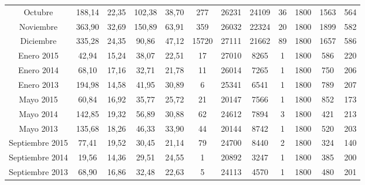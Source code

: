 \begin{table}[ht!]
{\begin{tabular}{|c|c|c|c|c|c|c|c|c|c|c|c|}
        Octubre         & 188,14    & 22,35     & 102,38  & 38,70 & 277     & 26231 & 24109 & 36   & 1800  & 1563  & 564 \\
        Noviembre       & 363,90    & 32,69     & 150,89  & 63,91 & 359     & 26032 & 22324 & 20   & 1800  & 1899  & 582 \\
        Diciembre       & 335,28    & 24,35     & 90,86   & 47,12 & 15720   & 27111 & 21662 & 89   & 1800  & 1657  & 586 \\
        \hline 
        Enero 2015      & 42,94     & 15,24     & 38,07   & 22,51 & 17      & 27010  & 8265  & 1   & 1800   & 586  & 220 \\
        Enero 2014      & 68,10     & 17,16     & 32,71   & 21,78 & 11      & 26014  & 7265  & 1   & 1800   & 750  & 206 \\
        Enero 2013      & 194,98    & 14,58     & 41,95   & 30,89 & 6       & 25341  & 6541  & 1   & 1800   & 789  & 207 \\
        Mayo 2015       & 60,84     & 16,92     & 35,77   & 25,72 & 21      & 20147  & 7566  & 1   & 1800   & 852  & 173 \\
        Mayo 2014       & 142,85    & 19,32     & 56,89   & 30,88 & 62      & 24612  & 7894  & 3   & 1800   & 421  & 213 \\
        Mayo 2013       & 135,68    & 18,26     & 46,33   & 33,90 & 44      & 20144  & 8742  & 1   & 1800   & 520  & 203 \\
        Septiembre 2015 & 77,41     & 19,52     & 30,45   & 21,14 & 79      & 24700  & 8440  & 2   & 1800   & 324  & 140 \\
        Septiembre 2014 & 19,56     & 14,36     & 29,51   & 24,55 & 1       & 20892  & 3247  & 1   & 1800   & 385  & 200 \\
        Septiembre 2013 & 68,90     & 16,86     & 32,48   & 22,63 & 5       & 24113  & 4570  & 1   & 1800   & 480  & 201 \\
        \hline  
    \end{tabular}
    }   
\end{table}

